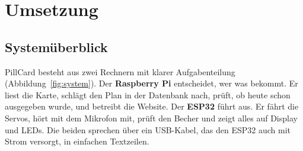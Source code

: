 \documentclass[11pt,a4paper]{article}
\begin{document}
\section{Umsetzung}
\label{sec:umsetzung}

\subsection{Systemüberblick}

PillCard besteht aus zwei Rechnern mit klarer Aufgabenteilung (Abbildung~\ref{fig:system}). Der
\textbf{Raspberry Pi} entscheidet, wer was bekommt. Er liest die Karte, schlägt den Plan in der Datenbank
nach, prüft, ob heute schon ausgegeben wurde, und betreibt die Website. Der \textbf{ESP32} führt aus. Er
fährt die Servos, hört mit dem Mikrofon mit, prüft den Becher und zeigt alles auf Display und LEDs. Die
beiden sprechen über ein USB-Kabel, das den ESP32 auch mit Strom versorgt, in einfachen Textzeilen.
\end{document}
